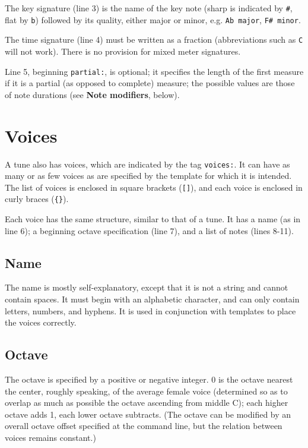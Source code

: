 \documentclass{article}
\begin{document}
The key signature (line 3) is the name of the key note (sharp is
indicated by \texttt{\#}, flat by \texttt{b}) followed by its quality,
either major or minor, e.g. \texttt{Ab major}, \texttt{F\# minor}.

The time signature (line 4) must be written as a fraction
(abbreviations such as \texttt{C} will not work).  There is no
provision for mixed meter signatures.

Line 5, beginning \texttt{partial:}, is optional; it specifies the
length of the first measure if it is a partial (as opposed to
complete) measure; the possible values are those of note durations
(see \textbf{Note modifiers}, below).

\section{Voices}

A tune also has voices, which are indicated by the tag
\texttt{voices:}.  It can have as many or as few voices as are
specified by the template for which it is intended.  The list of
voices is enclosed in square brackets (\texttt{{[]}}), and each voice
is enclosed in curly braces (\texttt{\{\}}).

Each voice has the same structure, similar to that of a tune.  It has
a name (as in line 6); a beginning octave specification (line 7), and
a list of notes (lines 8-11).

\subsection{Name}

The name is mostly self-explanatory, except that it is not a string
and cannot contain spaces.  It must begin with an alphabetic
character, and can only contain letters, numbers, and hyphens.  It is
used in conjunction with templates to place the voices correctly.

\subsection{Octave}

The octave is specified by a positive or negative integer.  0 is the
octave nearest the center, roughly speaking, of the average female
voice (determined so as to overlap as much as possible the octave
ascending from middle C); each higher octave adds 1, each lower octave
subtracts.  (The octave can be modified by an overall octave offset
specified at the command line, but the relation between voices remains
constant.)
\end{document}
